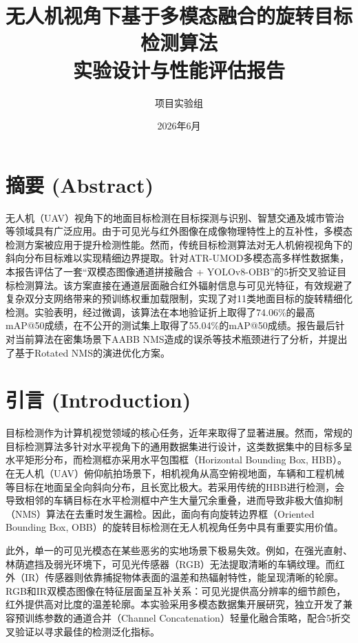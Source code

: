 \documentclass[utf8,a4paper,zihao=-4]{ctexart}
\title{\textbf{\heiti 无人机视角下基于多模态融合的旋转目标检测算法\\实验设计与性能评估报告}}
\author{项目实验组}
\date{2026年6月}
\begin{document}
\maketitle

\thispagestyle{empty}
\newpage

\tableofcontents
\thispagestyle{empty}
\newpage
\setcounter{page}{1}

\section*{摘要 (Abstract)}
无人机（UAV）视角下的地面目标检测在目标探测与识别、智慧交通及城市管治等领域具有广泛应用。由于可见光与红外图像在成像物理特性上的互补性，多模态检测方案被应用于提升检测性能。然而，传统目标检测算法对无人机俯视视角下的斜向分布目标难以实现精细边界提取。针对ATR-UMOD多模态高多样性数据集，本报告评估了一套“双模态图像通道拼接融合 + YOLOv8-OBB”的5折交叉验证目标检测算法。该方案直接在通道层面融合红外辐射信息与可见光特征，有效规避了复杂双分支网络带来的预训练权重加载限制，实现了对11类地面目标的旋转精细化检测。实验表明，经过微调，该算法在本地验证折上取得了74.06\%的最高mAP@50成绩，在不公开的测试集上取得了55.04\%的mAP@50成绩。报告最后针对当前算法在密集场景下AABB NMS造成的误杀等技术瓶颈进行了分析，并提出了基于Rotated NMS的演进优化方案。

\newpage

\section{引言 (Introduction)}
目标检测作为计算机视觉领域的核心任务，近年来取得了显著进展。然而，常规的目标检测算法多针对水平视角下的通用数据集进行设计，这类数据集中的目标多呈水平矩形分布，而检测框亦采用水平包围框（Horizontal Bounding Box, HBB）。在无人机（UAV）俯仰航拍场景下，相机视角从高空俯视地面，车辆和工程机械等目标在地面呈全向斜向分布，且长宽比极大。若采用传统的HBB进行检测，会导致相邻的车辆目标在水平检测框中产生大量冗余重叠，进而导致非极大值抑制（NMS）算法在去重时发生漏检。因此，面向有向旋转边界框（Oriented Bounding Box, OBB）的旋转目标检测在无人机视角任务中具有重要实用价值。

此外，单一的可见光模态在某些恶劣的实地场景下极易失效。例如，在强光直射、林荫遮挡及弱光环境下，可见光传感器（RGB）无法提取清晰的车辆纹理。而红外（IR）传感器则依靠捕捉物体表面的温差和热辐射特性，能呈现清晰的轮廓。RGB和IR双模态图像在特征层面呈互补关系：可见光提供高分辨率的细节颜色，红外提供高对比度的温差轮廓。本实验采用多模态数据集开展研究，独立开发了兼容预训练参数的通道合并（Channel Concatenation）轻量化融合策略，配合5折交叉验证以寻求最佳的检测泛化指标。
\end{document}
